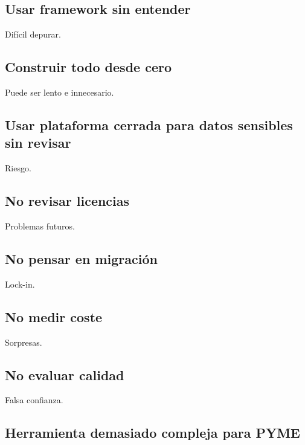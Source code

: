 \subsection{Usar framework sin
entender}\label{usar-framework-sin-entender}

Difícil depurar.

\subsection{Construir todo desde cero}\label{construir-todo-desde-cero}

Puede ser lento e innecesario.

\subsection{Usar plataforma cerrada para datos sensibles sin
revisar}\label{usar-plataforma-cerrada-para-datos-sensibles-sin-revisar}

Riesgo.

\subsection{No revisar licencias}\label{no-revisar-licencias}

Problemas futuros.

\subsection{No pensar en migración}\label{no-pensar-en-migraciuxf3n}

Lock-in.

\subsection{No medir coste}\label{no-medir-coste}

Sorpresas.

\subsection{No evaluar calidad}\label{no-evaluar-calidad-1}

Falsa confianza.

\subsection{Herramienta demasiado compleja para
PYME}\label{herramienta-demasiado-compleja-para-pyme}


